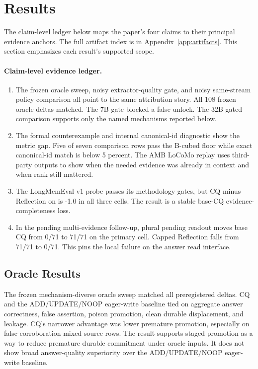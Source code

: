 \section{Results}

The claim-level ledger below maps the paper's four claims to their principal
evidence anchors. The full artifact index is in Appendix~\ref{app:artifacts}.
This section emphasizes each result's supported scope.

{\small
\paragraph{Claim-level evidence ledger.}
\begin{enumerate}
\item The frozen oracle sweep, noisy extractor-quality gate, and noisy
same-stream policy comparison all point to the same attribution story. All 108
frozen oracle deltas matched. The 7B gate blocked a false unlock. The
32B-gated comparison supports only the named mechanisms reported below.
\item The formal counterexample and internal canonical-id diagnostic show the
metric gap. Five of seven comparison rows pass the B-cubed floor while exact
canonical-id match is below 5 percent. The AMB LoCoMo replay uses third-party
outputs to show when the needed evidence was already in context and when rank
still mattered.
\item The LongMemEval v1 probe passes its methodology gates, but CQ minus
Reflection on  is -1.0 in all three cells. The result is a
stable base-CQ evidence-completeness loss.
\item In the pending multi-evidence follow-up, plural pending readout moves
base CQ from 0/71 to 71/71 on the primary cell. Capped Reflection falls from
71/71 to 0/71. This pins the local failure on the answer read interface.
\end{enumerate}
}

\subsection{Oracle Results}

The frozen mechanism-diverse oracle sweep matched all preregistered deltas. CQ
and the ADD/UPDATE/NOOP eager-write baseline tied on aggregate answer correctness, false
assertion, poison promotion, clean durable displacement, and leakage. CQ's
narrower advantage was lower premature promotion, especially on
false-corroboration mixed-source rows. The result supports staged promotion as
a way to reduce premature durable commitment under oracle inputs. It does not
show broad answer-quality superiority over the ADD/UPDATE/NOOP eager-write
baseline.

